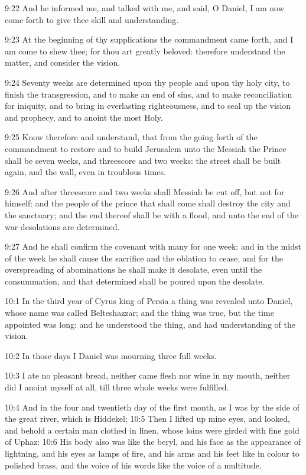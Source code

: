 9:22 And he informed me, and talked with me, and said, O Daniel, I am now come forth to give thee skill and understanding.

9:23 At the beginning of thy supplications the commandment came forth, and I am come to shew thee; for thou art greatly beloved: therefore understand the matter, and consider the vision.

9:24 Seventy weeks are determined upon thy people and upon thy holy city, to finish the transgression, and to make an end of sins, and to make reconciliation for iniquity, and to bring in everlasting righteousness, and to seal up the vision and prophecy, and to anoint the most Holy.

9:25 Know therefore and understand, that from the going forth of the commandment to restore and to build Jerusalem unto the Messiah the Prince shall be seven weeks, and threescore and two weeks: the street shall be built again, and the wall, even in troublous times.

9:26 And after threescore and two weeks shall Messiah be cut off, but not for himself: and the people of the prince that shall come shall destroy the city and the sanctuary; and the end thereof shall be with a flood, and unto the end of the war desolations are determined.

9:27 And he shall confirm the covenant with many for one week: and in the midst of the week he shall cause the sacrifice and the oblation to cease, and for the overspreading of abominations he shall make it desolate, even until the consummation, and that determined shall be poured upon the desolate.

10:1 In the third year of Cyrus king of Persia a thing was revealed unto Daniel, whose name was called Belteshazzar; and the thing was true, but the time appointed was long: and he understood the thing, and had understanding of the vision.

10:2 In those days I Daniel was mourning three full weeks.

10:3 I ate no pleasant bread, neither came flesh nor wine in my mouth, neither did I anoint myself at all, till three whole weeks were fulfilled.

10:4 And in the four and twentieth day of the first month, as I was by the side of the great river, which is Hiddekel; 10:5 Then I lifted up mine eyes, and looked, and behold a certain man clothed in linen, whose loins were girded with fine gold of Uphaz: 10:6 His body also was like the beryl, and his face as the appearance of lightning, and his eyes as lamps of fire, and his arms and his feet like in colour to polished brass, and the voice of his words like the voice of a multitude.

